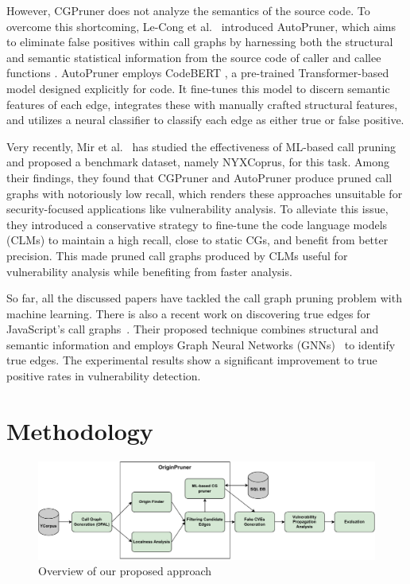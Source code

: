 However, CGPruner does not analyze the semantics of the source code. To overcome this shortcoming, Le-Cong et al.~\cite{le2022autopruner} introduced AutoPruner, which aims to eliminate false positives within call graphs by harnessing both the structural and semantic statistical information from the source code of caller and callee functions \cite{le2022autopruner}. AutoPruner employs CodeBERT \cite{feng2020codebert}, a pre-trained Transformer-based model \cite{vaswani2017attention} designed explicitly for code. It fine-tunes this model to discern semantic features of each edge, integrates these with manually crafted structural features, and utilizes a neural classifier to classify each edge as either true or false positive.

Very recently, Mir et al.~\cite{mir2024effectiveness}
has studied the effectiveness of ML-based call pruning and proposed a benchmark dataset, namely NYXCoprus, for this task. Among their findings, they found that CGPruner and AutoPruner produce pruned call graphs with notoriously low recall, which renders these approaches unsuitable for security-focused applications like vulnerability analysis. To alleviate this issue, they introduced a conservative strategy to fine-tune the code language models (CLMs) to maintain a high recall, close to static CGs, and benefit from better precision. This made pruned call graphs produced by CLMs useful for vulnerability analysis while benefiting from faster analysis.

So far, all the discussed papers have tackled the call graph pruning problem with machine learning. There is also a recent work on discovering true edges for JavaScript's call graphs~\cite{bhuiyan2023call}. Their proposed technique combines structural and semantic information and employs Graph Neural Networks (GNNs)~\cite{scarselli2008graph} to identify true edges. The experimental results show a significant improvement to true positive rates in vulnerability detection.

\section{Methodology}

\begin{figure}
    \centering
    \includegraphics[width=.9\textwidth]{chapters/ch2/figs/overview-cg-pruning.pdf}
    \caption{Overview of our proposed approach}
    \label{ch2:fig:overview}
\end{figure}

